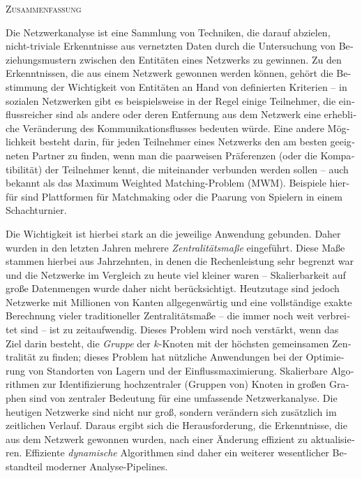 \pagestyle{plain}
\begin{center}
  \textsc{Zusammenfassung}
\end{center}
%
\begin{otherlanguage}{ngerman}
Die Netzwerkanalyse ist eine Sammlung von Techniken, die darauf abzielen,
nicht-triviale Erkenntnisse aus vernetzten Daten durch die Untersuchung von
Beziehungsmustern zwischen den Entitäten eines Netzwerks zu gewinnen.
Zu den Erkenntnissen, die aus einem Netzwerk
gewonnen werden können, gehört die Bestimmung der Wichtigkeit von Entitäten
an Hand von definierten Kriterien -- in sozialen Netzwerken gibt es
beispielsweise in der Regel einige Teilnehmer, die einflussreicher sind als
andere oder deren Entfernung aus dem Netzwerk eine erhebliche Veränderung des
Kommunikationsflusses bedeuten würde. Eine andere Möglichkeit besteht darin,
für jeden Teilnehmer eines Netzwerks den am besten geeigneten Partner zu
finden, wenn man die paarweisen Präferenzen (oder die Kompatibilität) der
Teilnehmer kennt, die miteinander verbunden werden sollen -- auch bekannt als
das Maximum Weighted Matching-Problem (MWM). Beispiele hierfür sind Plattformen
für Matchmaking oder die Paarung von Spielern in einem Schachturnier.

Die Wichtigkeit ist hierbei stark an die jeweilige Anwendung gebunden.
Daher wurden in den letzten Jahren mehrere \emph{Zentralitätsmaße} eingeführt.
Diese Maße
stammen hierbei aus Jahrzehnten, in denen die Rechenleistung sehr begrenzt war
und die Netzwerke im Vergleich zu heute viel kleiner waren -- Skalierbarkeit auf
große Datenmengen wurde daher nicht berücksichtigt.
Heutzutage sind jedoch Netzwerke mit Millionen von Kanten
allgegenwärtig und eine vollständige exakte Berechnung vieler traditioneller
Zentralitätsmaße -- die immer noch weit verbreitet sind -- ist zu zeitaufwendig.
Dieses Problem wird noch verstärkt, wenn das Ziel darin besteht, die
\emph{Gruppe} der $k$-Knoten mit der höchsten gemeinsamen Zentralität zu
finden; dieses Problem hat nützliche Anwendungen bei der Optimierung von
Standorten von Lagern und der Einflussmaximierung.
Skalierbare Algorithmen
zur Identifizierung hochzentraler (Gruppen von) Knoten in großen Graphen sind von
zentraler Bedeutung für eine umfassende Netzwerkanalyse.
%
Die heutigen Netzwerke sind nicht nur groß, sondern
verändern sich zusätzlich im zeitlichen Verlauf. Daraus ergibt
sich die Herausforderung, die Erkenntnisse, die aus dem Netzwerk
gewonnen wurden, nach einer Änderung effizient zu
aktualisieren. Effiziente \emph{dynamische} Algorithmen
sind daher ein weiterer wesentlicher Bestandteil moderner
Analyse-Pipelines.


\end{otherlanguage}
